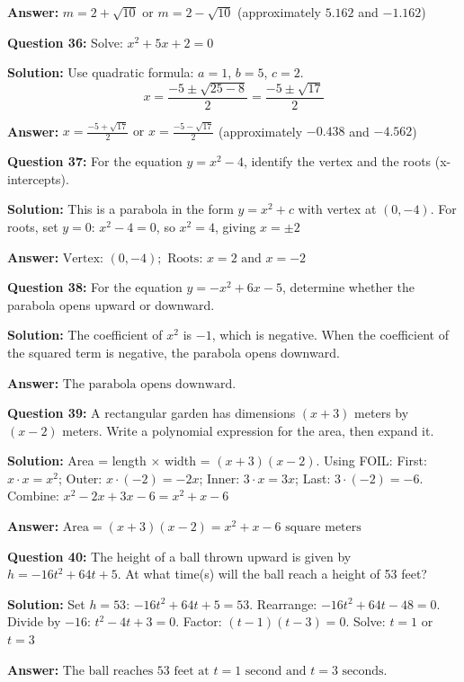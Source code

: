 \documentclass[12pt]{article}
\begin{document}
\textbf{Answer:} $\boxed{m = 2 + \sqrt{10} \text{ or } m = 2 - \sqrt{10}}$ (approximately $5.162$ and $-1.162$)

\vspace{0.3cm}
\noindent
\textbf{Question 36:} Solve: $x^2 + 5x + 2 = 0$

\textbf{Solution:} Use quadratic formula: $a = 1$, $b = 5$, $c = 2$.
\[x = \frac{-5 \pm \sqrt{25 - 8}}{2} = \frac{-5 \pm \sqrt{17}}{2}\]

\textbf{Answer:} $\boxed{x = \frac{-5 + \sqrt{17}}{2} \text{ or } x = \frac{-5 - \sqrt{17}}{2}}$ (approximately $-0.438$ and $-4.562$)

\vspace{0.3cm}
\noindent
\textbf{Question 37:} For the equation $y = x^2 - 4$, identify the vertex and the roots (x-intercepts).

\textbf{Solution:} This is a parabola in the form $y = x^2 + c$ with vertex at $(0, -4)$. For roots, set $y = 0$: $x^2 - 4 = 0$, so $x^2 = 4$, giving $x = \pm 2$

\textbf{Answer:} $\boxed{\text{Vertex: } (0, -4); \text{ Roots: } x = 2 \text{ and } x = -2}$

\vspace{0.3cm}
\noindent
\textbf{Question 38:} For the equation $y = -x^2 + 6x - 5$, determine whether the parabola opens upward or downward.

\textbf{Solution:} The coefficient of $x^2$ is $-1$, which is negative. When the coefficient of the squared term is negative, the parabola opens downward.

\textbf{Answer:} $\boxed{\text{The parabola opens downward.}}$

\vspace{0.3cm}
\noindent
\textbf{Question 39:} A rectangular garden has dimensions $(x + 3)$ meters by $(x - 2)$ meters. Write a polynomial expression for the area, then expand it.

\textbf{Solution:} Area = length $\times$ width = $(x + 3)(x - 2)$. Using FOIL: First: $x \cdot x = x^2$; Outer: $x \cdot (-2) = -2x$; Inner: $3 \cdot x = 3x$; Last: $3 \cdot (-2) = -6$. Combine: $x^2 - 2x + 3x - 6 = x^2 + x - 6$

\textbf{Answer:} $\boxed{\text{Area} = (x + 3)(x - 2) = x^2 + x - 6 \text{ square meters}}$

\vspace{0.3cm}
\noindent
\textbf{Question 40:} The height of a ball thrown upward is given by $h = -16t^2 + 64t + 5$. At what time(s) will the ball reach a height of 53 feet?

\textbf{Solution:} Set $h = 53$: $-16t^2 + 64t + 5 = 53$. Rearrange: $-16t^2 + 64t - 48 = 0$. Divide by $-16$: $t^2 - 4t + 3 = 0$. Factor: $(t - 1)(t - 3) = 0$. Solve: $t = 1$ or $t = 3$

\textbf{Answer:} $\boxed{\text{The ball reaches 53 feet at } t = 1 \text{ second and } t = 3 \text{ seconds.}}$
\end{document}
